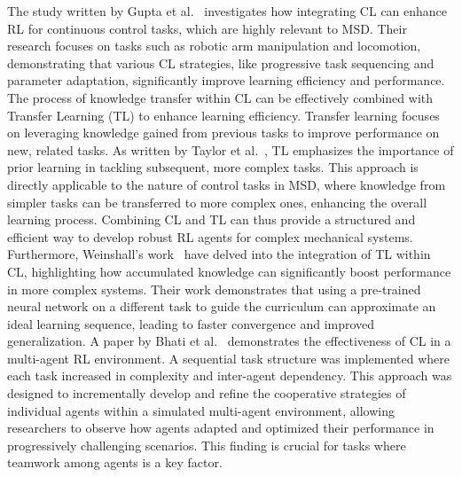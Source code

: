 The study written by Gupta et al.~\cite{gupta2021rlcapabilities} investigates how integrating CL can enhance RL for continuous control tasks, which are highly relevant to MSD. Their research focuses on tasks such as robotic arm manipulation and locomotion, demonstrating that various CL strategies, like progressive task sequencing and parameter adaptation, significantly improve learning efficiency and performance. 
The process of knowledge transfer within CL can be effectively combined with Transfer Learning (TL) to enhance learning efficiency. Transfer learning focuses on leveraging knowledge gained from previous tasks to improve performance on new, related tasks. As written by Taylor et al.~\cite{taylor2009transferlearning}, TL emphasizes the importance of prior learning in tackling subsequent, more complex tasks. This approach is directly applicable to the nature of control tasks in MSD, where knowledge from simpler tasks can be transferred to more complex ones, enhancing the overall learning process. Combining CL and TL can thus provide a structured and efficient way to develop robust RL agents for complex mechanical systems. Furthermore, Weinshall's work~\cite{weinshall2018cltransfer} have delved into the integration of TL within CL, highlighting how accumulated knowledge can significantly boost performance in more complex systems. Their work demonstrates that using a pre-trained neural network on a different task to guide the curriculum can approximate an ideal learning sequence, leading to faster convergence and improved generalization. 
A paper by Bhati et al.~\cite{bhati2023clmulti} demonstrates the effectiveness of CL in a multi-agent RL environment. A sequential task structure was implemented where each task increased in complexity and inter-agent dependency. This approach was designed to incrementally develop and refine the cooperative strategies of individual agents within a simulated multi-agent environment, allowing researchers to observe how agents adapted and optimized their performance in progressively challenging scenarios. This finding is crucial for tasks where teamwork among agents is a key factor. 

